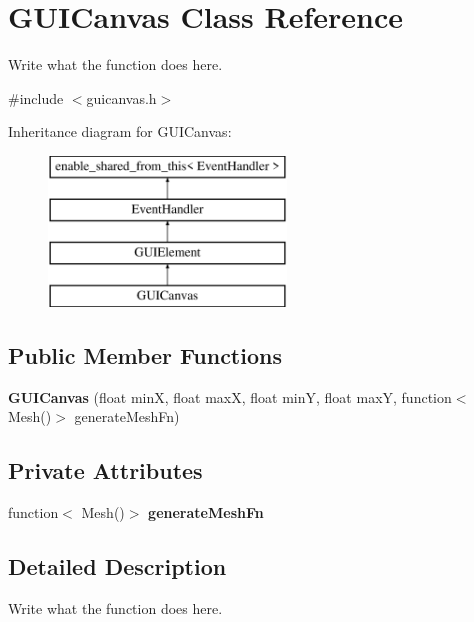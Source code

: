 \hypertarget{classGUICanvas}{\section{G\+U\+I\+Canvas Class Reference}
\label{classGUICanvas}
}


Write what the function does here.  




{\ttfamily \#include $<$guicanvas.\+h$>$}

Inheritance diagram for G\+U\+I\+Canvas\+:\begin{figure}[H]
\begin{center}
\leavevmode
\includegraphics[height=4.000000cm]{classGUICanvas}
\end{center}
\end{figure}
\subsection*{Public Member Functions}
\begin{DoxyCompactItemize}
\item 
\hypertarget{classGUICanvas_a2e6418e2376d80fddab7a747dd15da36}{{\bfseries G\+U\+I\+Canvas} (float min\+X, float max\+X, float min\+Y, float max\+Y, function$<$ Mesh()$>$ generate\+Mesh\+Fn)}\label{classGUICanvas_a2e6418e2376d80fddab7a747dd15da36}

\end{DoxyCompactItemize}
\subsection*{Private Attributes}
\begin{DoxyCompactItemize}
\item 
\hypertarget{classGUICanvas_a3758be22090e23d9c7d566a5a08041d5}{function$<$ Mesh()$>$ {\bfseries generate\+Mesh\+Fn}}\label{classGUICanvas_a3758be22090e23d9c7d566a5a08041d5}

\end{DoxyCompactItemize}


\subsection{Detailed Description}
Write what the function does here. 


